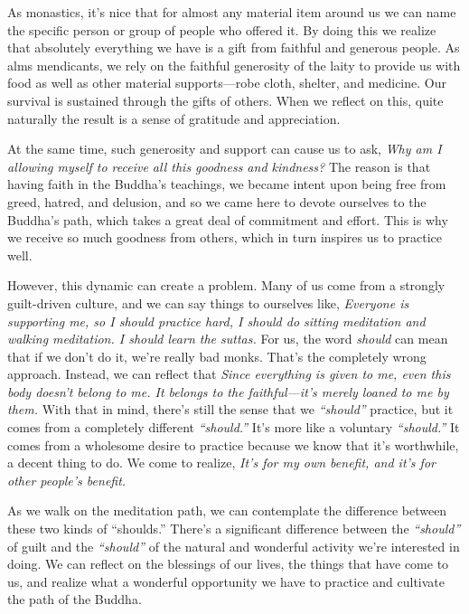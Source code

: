 As monastics, it's nice that for almost any material item around us we 
can name the specific person or group of people who offered it. By 
doing this we realize that absolutely everything we have is a gift from 
faithful and generous people. As alms mendicants, we rely on the 
faithful generosity of the laity to provide us with food as well as 
other material supports---robe cloth, shelter, and medicine. Our 
survival is sustained through the gifts of others. When we reflect on 
this, quite naturally the result is a sense of gratitude and 
appreciation.

At the same time, such generosity and support can cause us to ask, 
\emph{Why am I allowing myself to receive all this goodness and 
kindness?} The reason is that having faith in the Buddha's teachings, 
we became intent upon being free from greed, hatred, and delusion, and 
so we came here to devote ourselves to the Buddha's path, which takes a 
great deal of commitment and effort. This is why we receive so much 
goodness from others, which in turn inspires us to practice well.

However, this dynamic can create a problem. Many of us come from a 
strongly guilt-driven culture, and we can say things to ourselves like, 
\emph{Everyone is supporting me, so I should practice hard, I should do 
sitting meditation and walking meditation. I should learn the suttas.} 
For us, the word \emph{should} can mean that if we don't do it, we're 
really bad monks. That's the completely wrong approach. Instead, we can 
reflect that \emph{Since everything is given to me, even this body 
doesn't belong to me. It belongs to the faithful---it's merely loaned 
to me by them.} With that in mind, there's still the sense that we 
\emph{``should''} practice, but it comes from a completely different 
\emph{``should.''} It's more like a voluntary \emph{``should.''} It 
comes from a wholesome desire to practice because we know that it's 
worthwhile, a decent thing to do. We come to realize, \emph{It's for my 
own benefit, and it's for other people's benefit.}

As we walk on the meditation path, we can contemplate the difference 
between these two kinds of ``shoulds.'' There's a significant 
difference between the \emph{``should''} of guilt and the 
\emph{``should''} of the natural and wonderful activity we're 
interested in doing. We can reflect on the blessings of our lives, the 
things that have come to us, and realize what a wonderful opportunity 
we have to practice and cultivate the path of the Buddha.


